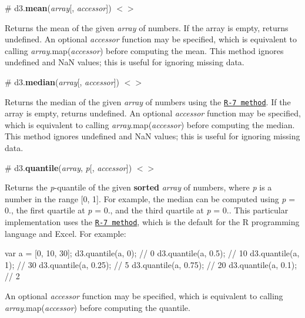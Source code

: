 \label{_mean}%
\# d3.{\bfseries mean}({\itshape array}\mbox{[}, {\itshape accessor}\mbox{]}) \href{https://github.com/d3/d3-array/blob/master/src/mean.js}{\tt $<$$>$}

Returns the mean of the given {\itshape array} of numbers. If the array is empty, returns undefined. An optional {\itshape accessor} function may be specified, which is equivalent to calling {\itshape array}.map({\itshape accessor}) before computing the mean. This method ignores undefined and NaN values; this is useful for ignoring missing data.

\label{_median}%
\# d3.{\bfseries median}({\itshape array}\mbox{[}, {\itshape accessor}\mbox{]}) \href{https://github.com/d3/d3-array/blob/master/src/median.js}{\tt $<$$>$}

Returns the median of the given {\itshape array} of numbers using the \href{https://en.wikipedia.org/wiki/Quantile#Estimating_quantiles_from_a_sample}{\tt R-\/7 method}. If the array is empty, returns undefined. An optional {\itshape accessor} function may be specified, which is equivalent to calling {\itshape array}.map({\itshape accessor}) before computing the median. This method ignores undefined and NaN values; this is useful for ignoring missing data.

\label{_quantile}%
\# d3.{\bfseries quantile}({\itshape array}, {\itshape p}\mbox{[}, {\itshape accessor}\mbox{]}) \href{https://github.com/d3/d3-array/blob/master/src/quantile.js}{\tt $<$$>$}

Returns the {\itshape p}-\/quantile of the given {\bfseries sorted} {\itshape array} of numbers, where {\itshape p} is a number in the range \mbox{[}0, 1\mbox{]}. For example, the median can be computed using {\itshape p} = 0., the first quartile at {\itshape p} = 0., and the third quartile at {\itshape p} = 0.. This particular implementation uses the \href{http://en.wikipedia.org/wiki/Quantile#Quantiles_of_a_population}{\tt R-\/7 method}, which is the default for the R programming language and Excel. For example\+:


\begin{DoxyCode}
var a = [0, 10, 30];
d3.quantile(a, 0); // 0
d3.quantile(a, 0.5); // 10
d3.quantile(a, 1); // 30
d3.quantile(a, 0.25); // 5
d3.quantile(a, 0.75); // 20
d3.quantile(a, 0.1); // 2
\end{DoxyCode}


An optional {\itshape accessor} function may be specified, which is equivalent to calling {\itshape array}.map({\itshape accessor}) before computing the quantile.

